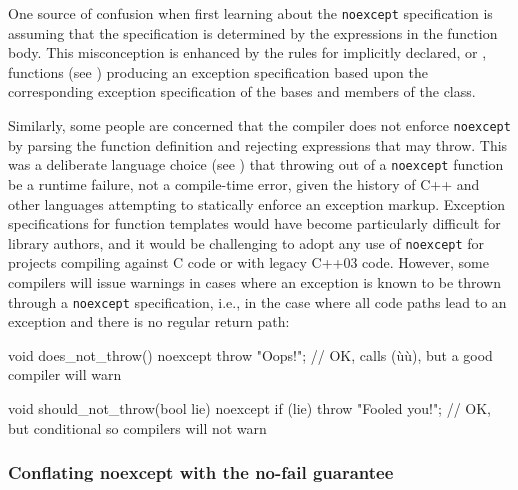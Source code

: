 One source of confusion when first learning about the \lstinline!noexcept!
specification is assuming that the specification is determined by the
expressions in the function body. This misconception is enhanced by the
rules for implicitly declared, or , functions (see
) producing an exception specification
based upon the corresponding exception specification of the bases and
members of the class.

Similarly, some people are concerned that the compiler does not enforce
\lstinline!noexcept! by parsing the function definition and rejecting
expressions that may throw. This was a deliberate language choice (see
) that throwing out of a \lstinline!noexcept!
function be a runtime failure, not a compile-time error, given the
history of C++ and other languages attempting to statically enforce an
exception markup. Exception specifications for function templates would
have become particularly difficult for library authors, and it would be
challenging to adopt any use of \lstinline!noexcept! for projects compiling
against C code or with legacy C++03 code. However, some compilers will
issue warnings in cases where an exception is known to be thrown through
a \lstinline!noexcept! specification, i.e., in the case where all code
paths lead to an exception and there is no regular return path:

\begin{emcppslisting}
void does_not_throw() noexcept
{
    throw "Oops!";  // OK, calls (ù{}ù), but a good compiler will warn
}

void should_not_throw(bool lie) noexcept
{
    if (lie)
    {
        throw "Fooled you!";  // OK, but conditional so compilers will not warn
    }
}
\end{emcppslisting}
    

\subsubsection[Conflating \lstinline!noexcept! with the no-fail guarantee]{Conflating {\SubsubsecCode noexcept} with the no-fail guarantee}\label{conflating-noexcept-with-the-no-fail-guarantee}


